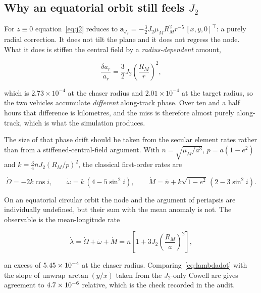 \subsection{Why an equatorial orbit still feels $J_2$}

For $z \equiv 0$ equation~\eqref{eq:j2} reduces to
$\mathbf a_{J_2} = -\tfrac{3}{2}J_2\mu_M R_M^2 r^{-5}\,[x, y, 0]^\top$: a purely
radial correction. It does not tilt the plane and it does not regress the node.
What it does is stiffen the central field by a \emph{radius-dependent} amount,

\begin{equation}
\frac{\delta a_r}{a_r} = \frac{3}{2} J_2 \left(\frac{R_M}{r}\right)^2,
\label{eq:j2ratio}
\end{equation}

which is $2.73\times10^{-4}$ at the chaser radius and $2.01\times10^{-4}$ at the
target radius, so the two vehicles accumulate \emph{different} along-track phase.
Over ten and a half hours that difference is kilometres, and the miss is
therefore almost purely along-track, which is what the simulation produces.

The size of that phase drift should be taken from the secular element rates
rather than from a stiffened-central-field argument. With
$\bar n = \sqrt{\mu_M/a^3}$, $p = a(1-e^2)$ and $k = \tfrac34 \bar n J_2 (R_M/p)^2$,
the classical first-order rates are \cite{vallado}

\begin{equation}
\dot\Omega = -2k\cos i, \qquad
\dot\omega = k\,(4 - 5\sin^2 i), \qquad
\dot M = \bar n + k\sqrt{1-e^2}\,(2 - 3\sin^2 i).
\label{eq:secular}
\end{equation}

On an equatorial circular orbit the node and the argument of periapsis are
individually undefined, but their sum with the mean anomaly is not. The
observable is the mean-longitude rate

\begin{equation}
\dot\lambda = \dot\Omega + \dot\omega + \dot M
            = \bar n\left[1 + 3 J_2 \left(\frac{R_M}{a}\right)^{\!2}\right],
\label{eq:lambdadot}
\end{equation}

an excess of $5.45\times 10^{-4}$ at the chaser radius. Comparing~\eqref{eq:lambdadot}
with the slope of $\mathrm{unwrap}\,\arctan(y/x)$ taken from the $J_2$-only
Cowell arc gives agreement to $4.7\times 10^{-6}$ relative, which is the check
recorded in the audit.

